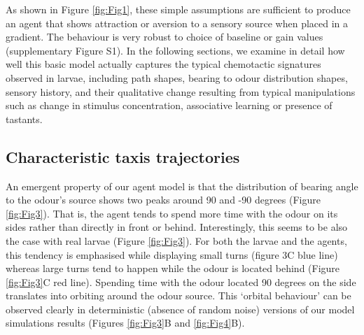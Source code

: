 \documentclass[10pt,a4paper]{article}
\begin{document}
As shown in Figure \ref{fig:Fig1}, these simple assumptions are sufficient to produce an agent that shows attraction or aversion to a sensory source when placed in a gradient.  The behaviour is very robust to choice of baseline or gain values (supplementary Figure S1). In the following sections, we examine in detail how well this basic model actually captures the typical chemotactic signatures observed in larvae, including path shapes, bearing to odour distribution shapes, sensory history, and their qualitative change resulting from typical manipulations such as change in stimulus concentration, associative learning or presence of tastants.


\subsection{Characteristic taxis trajectories}
An emergent property of our agent model is that the distribution of bearing angle to the odour's source shows two peaks around 90 and -90 degrees (Figure \ref{fig:Fig3}). That is, the agent tends to spend more time with the odour on its sides rather than directly in front or behind. Interestingly, this seems to be also the case with real larvae (Figure \ref{fig:Fig3}). For both the larvae and the agents, this tendency is emphasised while displaying small turns (figure 3C blue line) whereas large turns tend to happen while the odour is located behind (Figure \ref{fig:Fig3}C red line). Spending time with the odour located 90 degrees on the side translates into orbiting around the odour source. This ‘orbital behaviour’ can be observed clearly in deterministic (absence of random noise) versions of our model simulations results (Figures \ref{fig:Fig3}B and \ref{fig:Fig4}B).
\end{document}
